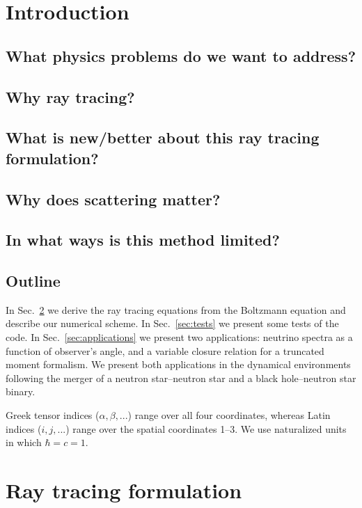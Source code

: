 \documentclass[aps,prd,twocolumn,superscriptaddress,groupedaddress]{revtex4}
\begin{document}
\section{Introduction}

\subsection{What physics problems do we want to address?}

\subsection{Why ray tracing?}

\subsection{What is new/better about this ray tracing formulation?}

\subsection{Why does scattering matter?}

\subsection{In what ways is this method limited?}

\subsection{Outline}

In Sec.~\ref{sec:formulation} we derive the ray tracing equations from the
Boltzmann equation and describe our numerical scheme.
In Sec.~\ref{sec:tests} we present some tests of the code.
In Sec.~\ref{sec:applications} we present two applications:
neutrino spectra as a function of observer's angle, and
a variable closure relation for a truncated moment formalism.
We present both applications in the dynamical environments following the merger
of a neutron star--neutron star and a black hole--neutron star binary.

Greek tensor indices ($\alpha, \beta, ...$) range over all four coordinates,
whereas Latin indices ($i, j, ...$) range over the spatial coordinates 1--3.
We use naturalized units in which $\hbar=c=1$.

\section{Ray tracing formulation}
\label{sec:formulation}
\end{document}

